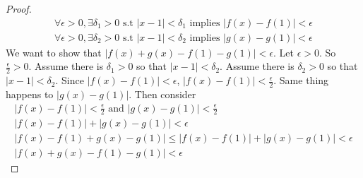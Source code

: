 \documentclass{article}
\theoremstyle{claim}
\theoremstyle{definition}
\begin{document}
\begin{enumerate}
\begin{proof}
            \begin{gather*}
                \forall \epsilon > 0, \exists \delta_1 > 0 \text{ s.t } |x - 1| < \delta_1 \text{ implies } |f(x) - f(1)| < \epsilon\\
                \forall \epsilon > 0, \exists \delta_2 > 0 \text{ s.t } |x - 1| < \delta_2 \text{ implies } |g(x) - g(1)| < \epsilon
            \end{gather*}
            We want to show that $|f(x) + g(x) - f(1) - g(1)| < \epsilon$.
            Let $\epsilon > 0$. So $\frac{\epsilon}{2} > 0$. Assume there is $\delta_1 > 0$ so that $|x - 1| < \delta_2$. Assume there is $\delta_2 > 0$ so that $|x - 1| < \delta_2$. Since $|f(x) - f(1)| < \epsilon$, $|f(x) - f(1)| < \frac{\epsilon}{2}$. Same thing happens to $|g(x) - g(1)|$. Then consider
            \begin{gather*}
                |f(x) - f(1)| < \frac{\epsilon}{2} \text{ and } |g(x) - g(1)| < \frac{\epsilon}{2}\\
                |f(x) - f(1)| + |g(x) - g(1)| < \epsilon\\
                |f(x) - f(1) + g(x) - g(1)| \le |f(x) - f(1)| + |g(x) - g(1)| < \epsilon\\
                |f(x) + g(x) - f(1) - g(1)| < \epsilon
            \end{gather*}
        \end{proof}
\end{enumerate}
\end{document}
